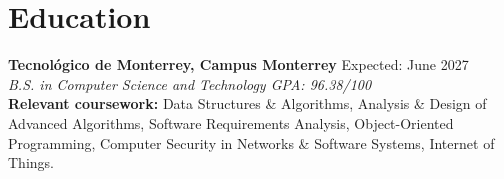 \documentclass[10pt,letterpaper]{article}
\newcommand{\project}[3]{\vspace{2pt}\textbf{#1} \hfill #2 \\ \textit{#3} \par\vspace{1pt}}
\newcommand{\resumeSubheading}[3]{%
  \vspace{2pt}\textbf{#1} \hfill #2 \\
  \textit{#3} \\
}
\begin{document}

\section{Education}
\resumeSubheading{Tecnol\'ogico de Monterrey, Campus Monterrey}{Expected: June 2027}{B.S. in Computer Science and Technology \quad GPA: 96.38/100}
\textbf{Relevant coursework:} Data Structures \& Algorithms, Analysis \& Design of Advanced Algorithms, Software Requirements Analysis, Object-Oriented Programming, Computer Security in Networks \& Software Systems, Internet of Things.
\end{document}
